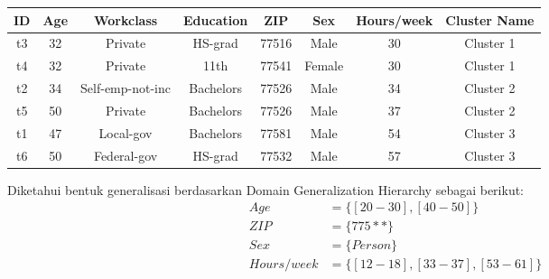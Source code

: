 \begin{tabular}{c c c c c c c c}
\hline 
ID & Age & Workclass & Education & ZIP & Sex & Hours/week & Cluster Name\\ 
\hline 
t3 & 32 & Private & HS-grad & 77516 & Male & 30 & Cluster 1 \\ 
t4 & 32 & Private & 11th & 77541 & Female & 30 & Cluster 1 \\ 
\hline 
t2 & 34 & Self-emp-not-inc & Bachelors & 77526 & Male & 34 & Cluster 2 \\ 
t5 & 50 & Private & Bachelors & 77526 & Male & 37	& Cluster 2\\ 
\hline 
t1 & 47 & Local-gov & Bachelors & 77581 & Male & 54 & Cluster 3\\ 
t6 & 50 & Federal-gov & HS-grad & 77532 & Male & 57 & Cluster 3\\ 
\hline 
\end{tabular} 

\vspace{0.4cm}

\noindent Diketahui bentuk generalisasi berdasarkan Domain Generalization Hierarchy sebagai berikut:
\begin{align*}
Age &= \{[20-30], [40-50]\}\\
ZIP &= \{775**\}\\
Sex &= \{Person\}\\
Hours/week &=\{[12-18], [33-37], [53-61]\}
\end{align*} 

